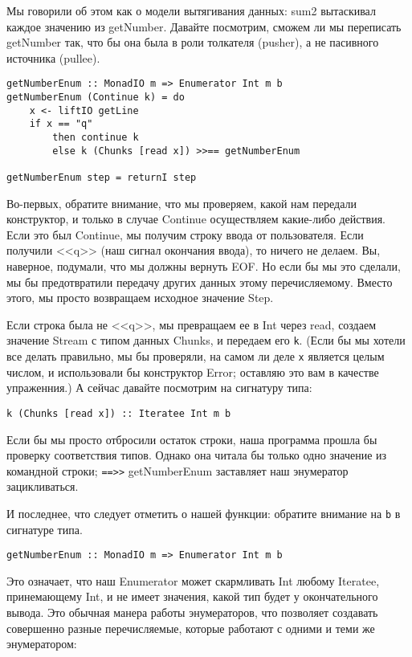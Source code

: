 Мы говорили об этом как о модели вытягивания данных: sum2 вытаскивал каждое значению из getNumber. Давайте посмотрим, сможем ли мы переписать getNumber так, что бы она была в роли толкателя (pusher), а не пасивного источника (pullee).

\begin{lstlisting}
getNumberEnum :: MonadIO m => Enumerator Int m b
getNumberEnum (Continue k) = do
    x <- liftIO getLine
    if x == "q"
        then continue k
        else k (Chunks [read x]) >>== getNumberEnum
        
getNumberEnum step = returnI step
\end{lstlisting}

Во-первых, обратите внимание, что мы проверяем, какой нам передали конструктор, и только в случае Continue осуществляем какие-либо действия. Если это был Continue, мы получим строку ввода от пользователя. Если получили <<q>> (наш сигнал окончания ввода), то ничего не делаем. Вы, наверное, подумали, что мы должны вернуть EOF. Но если бы мы это сделали, мы бы предотвратили передачу других данных этому перечисляемому. Вместо этого, мы просто возвращаем исходное значение Step.

Если строка была не <<q>>, мы превращаем ее в Int через read, создаем значение Stream с типом данных Chunks, и передаем его \lstinline'k'. (Если бы мы хотели все делать правильно, мы бы проверяли, на самом ли деле \lstinline'x' является целым числом, и использовали бы конструктор Error; оставляю это вам в качестве упраженния.) А сейчас давайте посмотрим на сигнатуру типа:

\begin{lstlisting}
k (Chunks [read x]) :: Iteratee Int m b
\end{lstlisting}

Если бы мы просто отбросили остаток строки, наша программа прошла бы проверку соответствия типов. Однако она читала бы только одно значение из командной строки; \lstinline'==>>' getNumberEnum заставляет наш энумератор зацикливаться.

И последнее, что следует отметить о нашей функции: обратите внимание на \lstinline'b' в сигнатуре типа.

\begin{lstlisting}
getNumberEnum :: MonadIO m => Enumerator Int m b
\end{lstlisting}

Это означает, что наш Enumerator может скармливать Int любому Iteratee, принемающему Int, и не имеет значения, какой тип будет у окончательного вывода. Это обычная манера работы энумераторов, что позволяет создавать совершенно разные перечисляемые, которые работают с одними и теми же энумератором:

